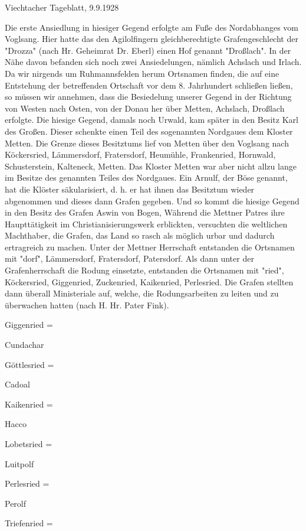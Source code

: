 \documentclass{book}
\begin{document}
Viechtacher Tageblatt, 9.9.1928

Die erste Ansiedlung in hiesiger Gegend erfolgte am Fuße des Nordabhanges vom
Voglsang. Hier hatte das den Agilolfingern gleichberechtigte Grafengeschlecht
der "Drozza" (nach Hr. Geheimrat Dr. Eberl) einen Hof genannt "Droßlach". In der
Nähe davon befanden sich noch zwei Ansiedelungen, nämlich Achslach und Irlach.
Da wir nirgends um Ruhmannsfelden herum Ortsnamen finden, die auf eine
Entstehung der betreffenden Ortschaft vor dem 8. Jahrhundert schließen ließen,
so müssen wir annehmen, dass die Besiedelung unserer Gegend in der Richtung von
Westen nach Osten, von der Donau her über Metten, Achslach, Droßlach erfolgte.
Die hiesige Gegend, damals noch Urwald, kam später in den Besitz Karl des
Großen. Dieser schenkte einen Teil des sogenannten Nordgaues dem Kloster Metten.
Die Grenze dieses Besitztums lief von Metten über den Voglsang nach Köckersried,
Lämmersdorf, Fratersdorf, Heumühle, Frankenried, Hornwald, Schusterstein,
Kalteneck, Metten. Das Kloster Metten war aber nicht allzu lange im Besitze des
genannten Teiles des Nordgaues. Ein Arnulf, der Böse genannt, hat die Klöster
säkularisiert, d. h. er hat ihnen das Besitztum wieder abgenommen und dieses
dann Grafen gegeben. Und so kommt die hiesige Gegend in den Besitz des Grafen
Aswin von Bogen, Während die Mettner Patres ihre Haupttätigkeit im
Christianisierungswerk erblickten, versuchten die weltlichen Machthaber, die
Grafen, das Land so rasch als möglich urbar und dadurch ertragreich zu machen.
Unter der Mettner Herrschaft entstanden die Ortsnamen mit "dorf", Lämmersdorf,
Fratersdorf, Patersdorf. Als dann unter der Grafenherrschaft die Rodung
einsetzte, entstanden die Ortsnamen mit "ried", Köckersried, Giggenried,
Zuckenried, Kaikenried, Perlesried. Die Grafen stellten dann überall
Ministeriale auf, welche, die Rodungsarbeiten zu leiten und zu überwachen hatten
(nach H. Hr. Pater Fink).



Giggenried    =

Cundachar

Göttlesried    =

Cadoal

Kaikenried    =

Hacco

Lobetsried    =

Luitpolf

Perlesried    =

Perolf

Triefenried    =
\end{document}
